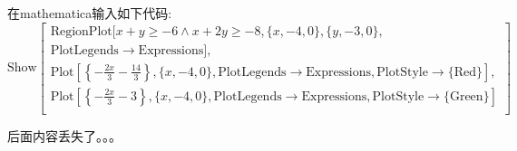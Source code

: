 \documentclass[UTF8]{ctexart}
\begin{document}
\begin{enumerate}
\begin{enumerate}
          \end{enumerate}
          在mathematica输入如下代码:
          \begin{equation*}
              \mathrm{Show}\left[ \begin{array}{c}
                      \mathrm{RegionPlot[}x+y\ge -6\land x+2y\ge -8,\{x,-4,0\},\{y,-3,0\},                                                                                                                      \\
                      \mathrm{PlotLegends}\rightarrow \mathrm{Expressions]},                                                                                                                                    \\
                      \mathrm{Plot}\left[ \left\{ -\frac{2x}{3}-\frac{14}{3} \right\} ,\{x,-4,0\},\mathrm{PlotLegends}\rightarrow \mathrm{Expressions},\mathrm{PlotStyle}\rightarrow \{\mathrm{Red}\} \right] , \\
                      \mathrm{Plot}\left[ \left\{ -\frac{2x}{3}-3 \right\} ,\{x,-4,0\},\mathrm{PlotLegends}\rightarrow \mathrm{Expressions},\mathrm{PlotStyle}\rightarrow \{\mathrm{Green}\} \right]            \\
                  \end{array} \right]
          \end{equation*}
\end{enumerate}

后面内容丢失了。。。
\end{document}
